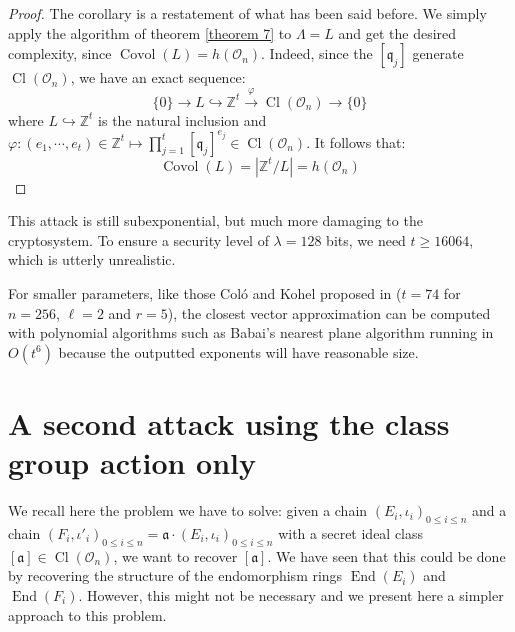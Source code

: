 \documentclass[a4paper,10pt]{report}
\theoremstyle{definition}
\theoremstyle{plain}
\theoremstyle{definition}
\newcommand{\Z}{\mathbb{Z}}
\newcommand{\mO}{\mathcal{O}}
\renewcommand{\(}{\left(}
\renewcommand{\)}{\right)}
\newcommand{\mf}[1]{\mathfrak{#1}}
\DeclareMathOperator{\End}{End}
\DeclareMathOperator{\Cl}{Cl}
\DeclareMathOperator{\Covol}{Covol}
\begin{document}
\begin{proof}
The corollary is a restatement of what has been said before. We simply apply the algorithm of theorem \ref{theorem 7} to $\Lambda=L$ and get the desired complexity, since $\Covol(L)=h(\mO_n)$.  Indeed, since the $[\mf{q}_j]$ generate $\Cl(\mO_n)$, we have an exact sequence:
\[\{0\}\longrightarrow L\hookrightarrow \Z^t\overset{\varphi}{\longrightarrow} \Cl(\mO_n)\longrightarrow\{0\}\]
where $ L\hookrightarrow \Z^t$ is the natural inclusion and $\varphi : (e_1,\cdots,e_t)\in\Z^t\longmapsto \prod_{j=1}^t[\mf{q}_j]^{e_j}\in \Cl(\mO_n)$. It follows that:
\[\Covol(L)=|\Z^t/L|=h(\mO_n)\]
\end{proof}

This attack is still subexponential, but much more damaging to the cryptosystem. To ensure a security level of $\lambda=128$ bits, we need $t\geq 16064$, which is utterly unrealistic. 

For smaller parameters, like those Col\'{o} and Kohel proposed in \cite[section 6]{OSIDH} ($t=74$ for $n=256$, $\ell=2$ and $r=5$), the closest vector approximation can be computed with polynomial algorithms such as Babai's nearest plane algorithm \cite{Babai} running in $O(t^6)$ because the outputted exponents will have reasonable size. 

\section{A second attack using the class group action only}

We recall here the problem we have to solve: given a chain $(E_i,\iota_i)_{0\leq i\leq n}$ and a chain $(F_i,\iota'_i)_{0\leq i\leq n}=\mf{a}\cdot(E_i,\iota_i)_{0\leq i\leq n}$ with a secret ideal class $[\mf{a}]\in\Cl(\mO_n)$, we want to recover $[\mf{a}]$. We have seen that this could be done by recovering the structure of the endomorphism rings $\End(E_i)$ and $\End(F_i)$. However, this might not be necessary and we present here a simpler approach to this problem. 
\end{document}
